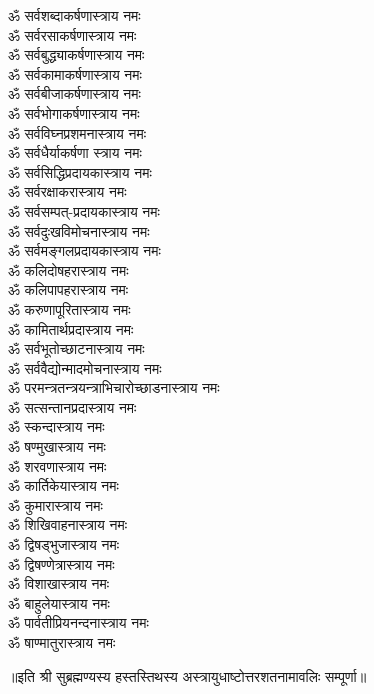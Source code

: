 \begin{flushleft}
\begin{multicols}{2}
ॐ सर्वशब्दाकर्षणास्त्राय नमः\\
ॐ सर्वरसाकर्षणास्त्राय नमः\\
ॐ सर्वबुद्ध्याकर्षणास्त्राय नमः\\
ॐ सर्वकामाकर्षणास्त्राय नमः\\
ॐ सर्वबीजाकर्षणास्त्राय नमः\hfill{}\\
ॐ सर्वभोगाकर्षणास्त्राय नमः\\
ॐ सर्वविघ्नप्रशमनास्त्राय नमः\\
ॐ सर्वधैर्याकर्षणा स्त्राय नमः\\
ॐ सर्वसिद्धिप्रदायकास्त्राय नमः\\
ॐ सर्वरक्षाकरास्त्राय नमः\\
ॐ सर्वसम्पत्-प्रदायकास्त्राय नमः\\
ॐ सर्वदुःखविमोचनास्त्राय नमः\\
ॐ सर्वमङ्गलप्रदायकास्त्राय नमः\\
ॐ कलिदोषहरास्त्राय नमः\\
ॐ कलिपापहरास्त्राय नमः\hfill{}\\
ॐ करुणापूरितास्त्राय नमः\\
ॐ कामितार्थप्रदास्त्राय नमः\\
ॐ सर्वभूतोच्छाटनास्त्राय नमः \\
ॐ सर्ववैद्योन्मादमोचनास्त्राय नमः \\
ॐ परमन्त्रतन्त्रयन्त्राभिचारोच्छाडनास्त्राय नमः\\
ॐ सत्सन्तानप्रदास्त्राय नमः\\
ॐ स्कन्दास्त्राय नमः\\
ॐ षण्मुखास्त्राय नमः\\
ॐ शरवणास्त्राय नमः\\
ॐ कार्तिकेयास्त्राय नमः\hfill{}\\
ॐ कुमारास्त्राय नमः\\
ॐ शिखिवाहनास्त्राय नमः\\
ॐ द्विषड्भुजास्त्राय नमः\\
ॐ द्विषण्णेत्रास्त्राय नमः\\
ॐ विशाखास्त्राय नमः\\
ॐ बाहुलेयास्त्राय नमः\\
ॐ पार्वतीप्रियनन्दनास्त्राय नमः\\
ॐ षाण्मातुरास्त्राय नमः\\
\end{multicols}
\end{flushleft}
\centerline{॥इति श्री सुब्रह्मण्यस्य हस्तस्तिथस्य अस्त्रायुधाष्टोत्तरशतनामावलिः सम्पूर्णा॥}
